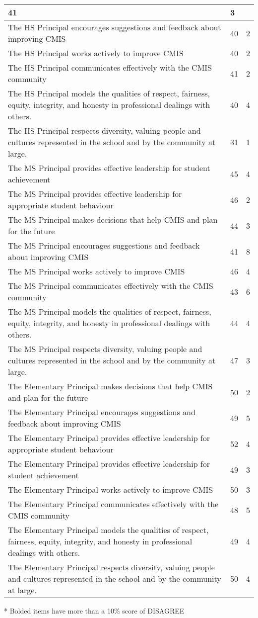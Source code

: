 \begin{table}[h]
\begin{longtabu}{|X[8]|X|X|}
41 &
3 \\
\hline
The HS Principal encourages suggestions and feedback about improving CMIS &
40 &
2 \\
\hline
The HS Principal works actively to improve CMIS &
40 &
2 \\
\hline
The HS Principal communicates effectively with the CMIS community &
41 &
2 \\
\hline
The HS Principal models the qualities of respect, fairness, equity, integrity, and honesty in professional dealings with others. &
40 &
4 \\
\hline
The HS Principal respects diversity, valuing people and cultures represented in the school and by the community at large. &
31 &
1 \\
\hline
The MS Principal provides effective leadership for student achievement &
45 &
4 \\
\hline
The MS Principal provides effective leadership for appropriate student behaviour &
46 &
2 \\
\hline
The MS Principal makes decisions that help CMIS and plan for the future &
44 &
3 \\
\hline
The MS Principal encourages suggestions and feedback about improving CMIS &
41 &
8 \\
\hline
The MS Principal works actively to improve CMIS &
46 &
4 \\
\hline
The MS Principal communicates effectively with the CMIS community &
43 &
6 \\
\hline
The MS Principal models the qualities of respect, fairness, equity, integrity, and honesty in professional dealings with others. &
44 &
4 \\
\hline
The MS Principal respects diversity, valuing people and cultures represented in the school and by the community at large. &
47 &
3 \\
\hline
The Elementary Principal makes decisions that help CMIS and plan for the future &
50 &
2 \\
\hline
The Elementary Principal encourages suggestions and feedback about improving CMIS &
49 &
5 \\
\hline
The Elementary Principal provides effective leadership for appropriate student behaviour &
52 &
4 \\
\hline
The Elementary Principal provides effective leadership for student achievement &
49 &
3 \\
\hline
The Elementary Principal works actively to improve CMIS &
50 &
3 \\
\hline
The Elementary Principal communicates effectively with the CMIS community &
48 &
5 \\
\hline
The Elementary Principal models the qualities of respect, fairness, equity, integrity, and honesty in professional dealings with others. &
49 &
4 \\
\hline
The Elementary Principal respects diversity, valuing people and cultures represented in the school and by the community at large. &
50 &
4 \\
\hline
\end{longtabu}
* Bolded items have more than a 10\% score of DISAGREE


\end{table}
